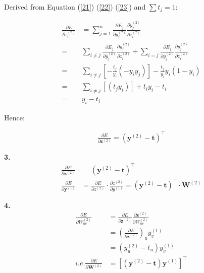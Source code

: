 \documentclass{article}
\begin{document}
Derived from Equation (\ref{21}) (\ref{22}) (\ref{23}) and $\sum t_j=1$:

\begin{equation}
\begin{aligned}
\frac{\partial E}{\partial z_i^{(2)}}&=\sum^n_{j=1}\frac{\partial E_j}{\partial y_j^{(2)}}\frac{\partial y_j^{(2)}}{\partial z_i^{(2)}}\\ =&\sum_{i\neq j}\frac{\partial E_j}{\partial y_j^{(2)}}\frac{\partial y_j^{(2)}}{\partial z_i^{(2)}}+\sum_{i=j}\frac{\partial E_j}{\partial y_j^{(2)}}\frac{\partial y_j^{(2)}}{\partial z_i^{(2)}}\\
=&\sum_{i\neq j}[-\frac{t_j}{y_i}(-y_iy_j)] -\frac{t_j}{y_i}y_i(1-y_i)\\
=&\sum_{i\neq j}[(t_jy_i)] +t_iy_i-t_i\\
=&y_i-t_i
\end{aligned}
\end{equation}

Hence:

\begin{equation}
\begin{aligned}
\frac{\partial E}{\partial \mathbf{z}^{(2)}}=(\mathbf{y}^{(2)}-\mathbf{t})^\top
\end{aligned}
\end{equation}

\textbf{3.}\\

\begin{equation}
\begin{aligned}
\frac{\partial E}{\partial \mathbf{z}^{(2)}}&=(\mathbf{y}^{(2)}-\mathbf{t})^\top\\
\frac{\partial E}{\partial \mathbf{y}^{(1)}}&=\frac {\partial E}{\partial z^(2)}\cdot \frac {\partial z^(2)}{\partial y^(1)}=(\mathbf{y}^{(2)}-\mathbf{t})^\top\cdot\mathbf{W}^{(2)}
\end{aligned}
\end{equation}

\textbf{4.}\\
\begin{equation}
\begin{aligned}
\frac{\partial E}{\partial W_{uv}^{(2)}}&=\frac{\partial E}{\partial \mathbf{z}^{(2)}}\frac{\partial \mathbf{z}^{(2)}}{\partial W_{uv}^{(2)}}\\
&=(\frac{\partial E}{\partial \mathbf{z}^{(2)}})_uy_v^{(1)}\\
&=(y_u^{(2)}-t_u)y_v^{(1)} \\
i.e. \frac{\partial E}{\partial \mathbf W^{(2)}}&=[(\mathbf y^{(2)}-\mathbf t)\mathbf y^{(1)} ]^\top
\end{aligned}
\end{equation}
\end{document}
